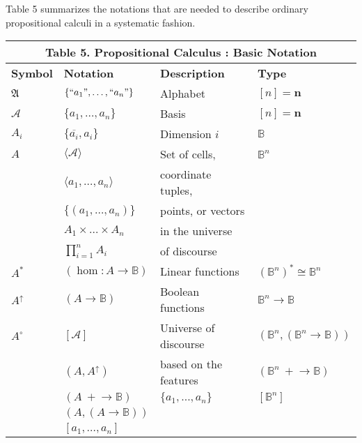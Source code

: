 \documentclass[12pt]{article}
\begin{document}
Table 5 summarizes the notations that are needed to describe ordinary propositional calculi in a systematic fashion.

\begin{center}\begin{tabular}{|l|l|l|l|}
\multicolumn{4}{c}{\textbf{Table 5.  Propositional Calculus : Basic Notation}} \\[8pt]
\hline

\textbf{Symbol} &
\textbf{Notation} &
\textbf{Description} &
\textbf{Type} \\[4pt]
\hline

$\mathfrak{A}$ &
$\{ ``a_1", \ldots, ``a_n" \}$ &
Alphabet &
$[n] = \mathbf{n}$ \\[4pt]
\hline

$\mathcal{A}$ &
$\{ a_1, \ldots, a_n \}$
& Basis &
$[n] = \mathbf{n}$ \\[4pt]
\hline

$A_i$ &
$\{ \overline{a_i}, a_i \}$ &
Dimension $i$ &
$\mathbb{B}$ \\[4pt]
\hline

$A$ & $\langle \mathcal{A} \rangle$      & Set of cells,      & $\mathbb{B}^n$ \\[4pt]
    & $\langle a_1, \ldots, a_n \rangle$ & coordinate tuples, & \\[4pt]
    & $\{ (a_1, \ldots, a_n) \}$         & points, or vectors & \\[4pt]
    & $A_1 \times \ldots \times A_n$     & in the universe    & \\[4pt]
    & $\textstyle \prod_{i=1}^n A_i$     & of discourse       & \\[4pt]
\hline

$A^*$ &
$(\operatorname{hom} : A \to \mathbb{B})$ &
Linear functions &
$(\mathbb{B}^n)^* \cong \mathbb{B}^n$ \\[4pt]
\hline

$A^\uparrow$ &
$(A \to \mathbb{B})$ &
Boolean functions &
$\mathbb{B}^n \to \mathbb{B}$ \\[4pt]
\hline

$A^\circ$ & $[ \mathcal{A} ]$         & Universe of discourse    &
$(\mathbb{B}^n, (\mathbb{B}^n \to \mathbb{B}))$                  \\[4pt]
          & $(A, A^\uparrow)$         & based on the features    &
$(\mathbb{B}^n\ +\!\to \mathbb{B})$                              \\[4pt]
          & $(A\ +\!\to \mathbb{B})$  & $\{ a_1, \ldots, a_n \}$ &
$[\mathbb{B}^n]$                                                 \\[4pt]
          & $(A, (A \to \mathbb{B}))$ & & \\[4pt]
          & $[ a_1, \ldots, a_n ]$    & & \\[4pt]
\hline
\end{tabular}\end{center}
\end{document}
